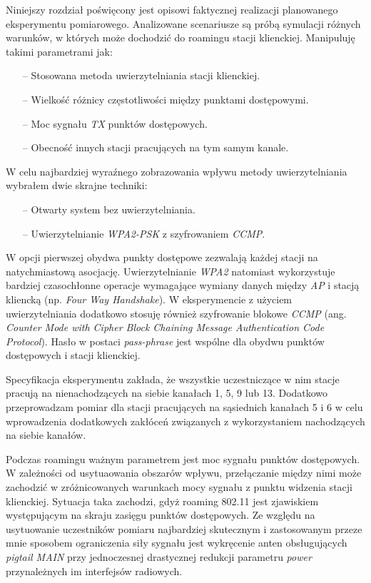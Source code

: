 %

Niniejszy rozdział poświęcony jest opisowi faktycznej realizacji planowanego eksperymentu pomiarowego. Analizowane scenariusze są próbą symulacji różnych warunków, w których może dochodzić do roamingu stacji klienckiej. Manipuluję takimi parametrami jak:
\begin{itemize}
\item[--] Stosowana metoda uwierzytelniania stacji klienckiej.
\item[--] Wielkość różnicy częstotliwości między punktami dostępowymi.
\item[--] Moc sygnału \emph{TX} punktów dostępowych. 
\item[--] Obecność innych stacji pracujących na tym samym kanale.
\end{itemize}

W celu najbardziej wyraźnego zobrazowania wpływu metody uwierzytelniania wybrałem dwie skrajne techniki:
\begin{itemize}
\item[--] Otwarty system bez uwierzytelniania.
\item[--] Uwierzytelnianie \emph{WPA2-PSK} z szyfrowaniem \emph{CCMP}.
\end{itemize}

W opcji pierwszej obydwa punkty dostępowe zezwalają każdej stacji na natychmiastową asocjację. Uwierzytelnianie \emph{WPA2} natomiast wykorzystuje bardziej czasochłonne operacje wymagające wymiany danych między \emph{AP} i stacją kliencką (np. \emph{Four Way Handshake}). W eksperymencie z użyciem uwierzytelniania dodatkowo stosuję również szyfrowanie blokowe \emph{CCMP} (ang. \emph{Counter Mode with Cipher Block Chaining Message Authentication Code Protocol}). Hasło w postaci \emph{pass-phrase} jest wspólne dla obydwu punktów dostępowych i stacji klienckiej.

Specyfikacja eksperymentu zakłada, że wszystkie uczestniczące w nim stacje pracują na nienachodzących na siebie kanałach 1, 5, 9 lub 13. Dodatkowo przeprowadzam pomiar dla stacji pracujących na sąsiednich kanałach 5 i 6 w celu wprowadzenia dodatkowych zakłóceń związanych z wykorzystaniem nachodzących na siebie kanałów.

Podczas roamingu ważnym parametrem jest moc sygnału punktów dostępowych. W zależności od usytuaowania obszarów wpływu, przełączanie między nimi może zachodzić w zróżnicowanych warunkach mocy sygnału z punktu widzenia stacji klienckiej. Sytuacja taka zachodzi, gdyż roaming 802.11 jest zjawiskiem występującym na skraju zasięgu punktów dostępowych. Ze względu na usytuowanie uczestników pomiaru najbardziej skutecznym i zastosowanym przeze mnie sposobem ograniczenia siły sygnału jest wykręcenie anten obsługujących \emph{pigtail MAIN} przy jednoczesnej drastycznej redukcji parametru \emph{power} przynależnych im interfejsów radiowych.

